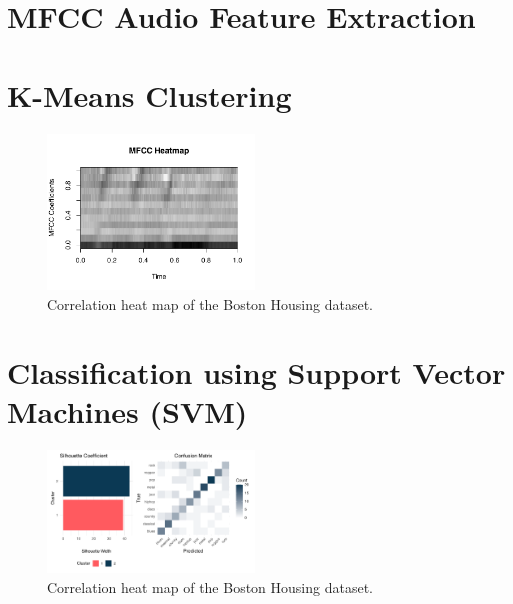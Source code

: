 \documentclass[twocolumn]{article}
\begin{document}
\section{MFCC Audio Feature Extraction}

\blindtext

\section{K-Means Clustering}
\begin{figure}[hht]
\centering
\includegraphics[width=0.49\textwidth]{images/mfcc_heatmap_8.pdf}
\caption{Correlation heat map of the Boston Housing dataset.}
\label{fig:corr}
\end{figure}


\blindtext

\section{Classification using Support Vector Machines (SVM)}
\begin{figure}[hht]
	\centering
	\includegraphics[width=0.49\textwidth]{images/clust_class.pdf}
  \caption{Correlation heat map of the Boston Housing dataset.}
	\label{fig:corr}
\end{figure}

\blindtext


\end{document}
